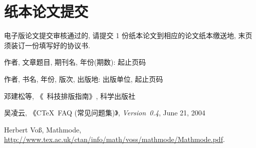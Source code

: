 \documentclass{WHUMaster}   %
\begin{document}
\section*{纸本论文提交}

    电子版论文提交审核通过的, 请提交 1 份纸本论文到相应的论文纸本缴送地,
    末页须装订一份填写好的协议书.





\cleardoublepage{}
{}
\begin{thebibliography}{000}

   作者, 文章题目, 期刊名, 年份(期数): 起止页码

   作者, 书名, 年份, 版次, 出版地: 出版单位, 起止页码

   邓建松等, 《\LaTeXe~科技排版指南》, 科学出版社

   吴凌云, 《CTeX~FAQ (常见问题集)》, \textit{Version~0.4}, June 21, 2004

   Herbert Vo\ss, Mathmode, \url{http://www.tex.ac.uk/ctan/info/math/voss/mathmode/Mathmode.pdf}.

\end{thebibliography}



\backmatter
\cleardoublepage
\end{document}
